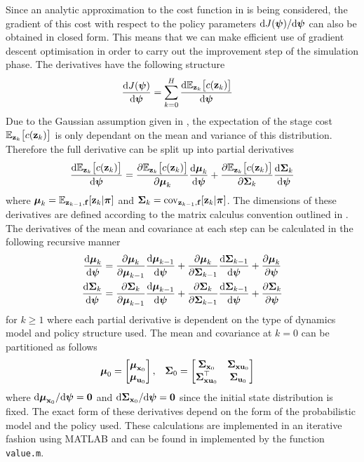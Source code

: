 Since an analytic approximation to the cost function in  is being considered, the gradient of this cost with respect to the policy parameters $\mathrm{d} J(\boldsymbol{\psi})/\mathrm{d}\boldsymbol{\psi}$ can also be obtained in closed form. This means that we can make efficient use of gradient descent optimisation in order to carry out the improvement step of the simulation phase. The derivatives have the following structure
\begin{align}
\diff{J(\bpsi)}{\bpsi} &= \sum_{k=0}^{H} \diff{\EE_{\bz_k}\big[c(\bz_k)\big]}{\bpsi} 
\label{eqn:Jderiv1}
\end{align}
Due to the Gaussian assumption given in , the expectation of the stage cost $\mathbb{E}_{\mathbf{z}_k}\big[c(\mathbf{z}_k)\big]$ is only dependant on the mean and variance of this distribution. Therefore the full derivative can be split up into partial derivatives
\begin{align}
\frac{\mathrm{d} \mathbb{E}_{\mathbf{z}_k}\big[c(\mathbf{z}_k)\big]}{\mathrm{d} \boldsymbol{\psi}} =
\frac{\mathrm{\partial} \mathbb{E}_{\mathbf{z}_k}\big[c(\mathbf{z}_k)\big]}{\mathrm{\partial} \boldsymbol{\mu}_k} \frac{\mathrm{d} \boldsymbol{\mu}_k}{\mathrm{d} \boldsymbol{\psi}} +
\frac{\mathrm{\partial} \mathbb{E}_{\mathbf{z}_k}\big[c(\mathbf{z}_k)\big]}{\mathrm{\partial} \boldsymbol{\Sigma}_k} \frac{\mathrm{d} \boldsymbol{\Sigma}_k}{\mathrm{d} \boldsymbol{\psi}}
\end{align}
where $\boldsymbol{\mu}_{k} = \mathbb{E}_{\mathbf{z}_{k-1},\mathbf{f}}[\mathbf{z}_k|\boldsymbol{\pi}]$ and $\boldsymbol{\Sigma}_{k} = \mathrm{cov}_{\mathbf{z}_{k-1},\mathbf{f}}[\mathbf{z}_k|\boldsymbol{\pi}]$. The dimensions of these derivatives are defined according to the matrix calculus convention outlined in . The derivatives of the mean and covariance at each step can be calculated in the following recursive manner
\begin{align}
\diff{\bm_k}{\bpsi} &= \pdiff{\bm_k}{\bm_{k-1}}\diff{\bm_{k-1}}{\bpsi} 
+ \pdiff{\bm_k}{\bS_{k-1}}\diff{\bS_{k-1}}{\bpsi} + \pdiff{\bm_k}{\bpsi} \\
\diff{\bS_k}{\bpsi} &= \pdiff{\bS_k}{\bm_{k-1}}\diff{\bm_{k-1}}{\bpsi} 
+ \pdiff{\bS_k}{\bS_{k-1}}\diff{\bS_{k-1}}{\bpsi} + \pdiff{\bS_k}{\bpsi}
\label{eqn:Jderiv2}
\end{align}
for $k \geq 1$ where each partial derivative is dependent on the type of dynamics model and policy structure used. The mean and covariance at $k=0$ can be partitioned as follows
\begin{align*}
\boldsymbol{\mu}_0 &= \begin{bmatrix} \boldsymbol{\mu}_{\mathbf{x}_0} \\ \boldsymbol{\mu}_{\mathbf{u}_0} \end{bmatrix}, 
&\boldsymbol{\Sigma}_0 &= \begin{bmatrix} \boldsymbol{\Sigma}_{\mathbf{x}_0} & \boldsymbol{\Sigma}_{\mathbf{x}\mathbf{u}_0} \\ \boldsymbol{\Sigma}_{\mathbf{x}\mathbf{u}_0}^\top & \boldsymbol{\Sigma}_{\mathbf{u}_0} \end{bmatrix}
\end{align*}
where $\mathrm{d}\boldsymbol{\mu}_{\mathbf{x}_0}/\mathrm{d}\boldsymbol{\psi} = \mathbf{0}$ and $\mathrm{d}\boldsymbol{\Sigma}_{\mathbf{x}_0}/\mathrm{d}\boldsymbol{\psi} = \mathbf{0}$ since the initial state distribution is fixed.  The exact form of these derivatives depend on the form of the probabilistic model and the policy used. These calculations are implemented in an iterative fashion using MATLAB and can be found in  implemented by the function \texttt{value.m}.























